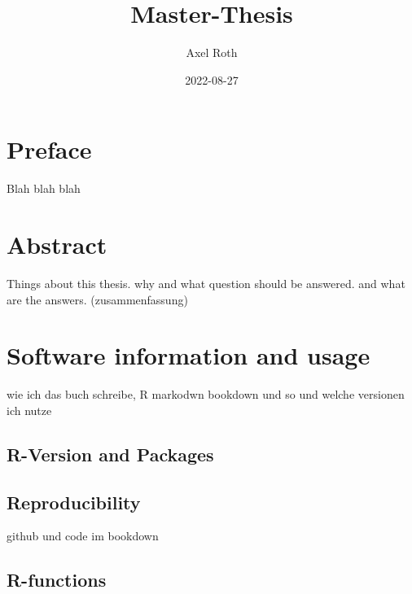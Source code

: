 \documentclass[
  oneside]{book}
\title{Master-Thesis}
\author{Axel Roth}
\date{2022-08-27}
\begin{document}
\maketitle

{
\setcounter{tocdepth}{1}
\tableofcontents
}
\hypertarget{preface}{%
\chapter*{Preface}\label{preface}}

\renewcommand{\chaptermark}[1]{\markboth{\uppercase{#1}}{\uppercase{#1}}}

Blah blah blah

\renewcommand{\chaptermark}[1]{\markboth{\uppercase{\thechapter. \ #1}}{}}

\hypertarget{abstract}{%
\chapter{Abstract}\label{abstract}}

Things about this thesis. why and what question should be answered. and what are the answers. (zusammenfassung)

\hypertarget{software-information-and-usage}{%
\chapter{Software information and usage}\label{software-information-and-usage}}

wie ich das buch schreibe, R markodwn bookdown und so und welche versionen ich nutze

\hypertarget{r-version-and-packages}{%
\section{R-Version and Packages}\label{r-version-and-packages}}

\hypertarget{reproducibility}{%
\section{Reproducibility}\label{reproducibility}}

github und code im bookdown

\hypertarget{r-functions}{%
\section{R-functions}\label{r-functions}}
\end{document}
